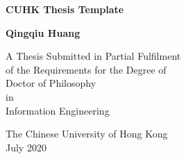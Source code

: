 
\begin{spacing}{1.3}
\begin{center}
	\vspace*{1cm}
	\Huge {\bf CUHK Thesis Template}

	\vskip 1cm
	\Large {\bf Qingqiu Huang}

	\vskip 1cm
	\large
	A Thesis Submitted in Partial Fulfilment \\
	of the Requirements for the Degree of \\
	Doctor of Philosophy \\
	in \\
	Information Engineering \\

	\vskip 1cm

	\vskip 0.5cm

	\vskip 1cm
	\large
	The Chinese University of Hong Kong \\
	July 2020
\end{center}
\end{spacing}
\clearpage
\[   \]
\clearpage
